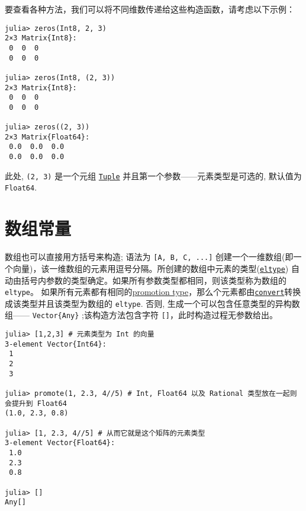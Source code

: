 

要查看各种方法，我们可以将不同维数传递给这些构造函数，请考虑以下示例：




\begin{verbatim}
julia> zeros(Int8, 2, 3)
2×3 Matrix{Int8}:
 0  0  0
 0  0  0

julia> zeros(Int8, (2, 3))
2×3 Matrix{Int8}:
 0  0  0
 0  0  0

julia> zeros((2, 3))
2×3 Matrix{Float64}:
 0.0  0.0  0.0
 0.0  0.0  0.0
\end{verbatim}



此处, \texttt{(2, 3)} 是一个元组 \hyperlink{17462354060312563026}{\texttt{Tuple}} 并且第一个参数——元素类型是可选的, 默认值为 \texttt{Float64}.



\hypertarget{15443953423472878802}{}


\section{数组常量}



数组也可以直接用方括号来构造; 语法为 \texttt{[A, B, C, ...]} 创建一个一维数组(即一个向量)，该一维数组的元素用逗号分隔。所创建的数组中元素的类型(\hyperlink{6396209842929672718}{\texttt{eltype}}) 自动由括号内参数的类型确定。如果所有参数类型都相同，则该类型称为数组的 \texttt{eltype}。 如果所有元素都有相同的\hyperlink{10374023657104680331}{promotion type}，那么个元素都由\hyperlink{1846942650946171605}{\texttt{convert}}转换成该类型并且该类型为数组的 \texttt{eltype}. 否则, 生成一个可以包含任意类型的异构数组—— \texttt{Vector\{Any\}} ;该构造方法包含字符 \texttt{[]}，此时构造过程无参数给出。




\begin{verbatim}
julia> [1,2,3] # 元素类型为 Int 的向量
3-element Vector{Int64}:
 1
 2
 3

julia> promote(1, 2.3, 4//5) # Int, Float64 以及 Rational 类型放在一起则会提升到 Float64
(1.0, 2.3, 0.8)

julia> [1, 2.3, 4//5] # 从而它就是这个矩阵的元素类型
3-element Vector{Float64}:
 1.0
 2.3
 0.8

julia> []
Any[]
\end{verbatim}



